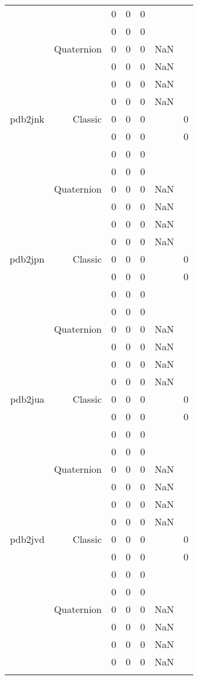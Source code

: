 \begin{xltabular}{\textwidth}{r|rcccSc}
& & 0 & 0 & 0 & & \\
& & 0 & 0 & 0 & & \\
& Quaternion & 0 & 0 & 0 & NaN & \\
& & 0 & 0 & 0 & NaN & \\
& & 0 & 0 & 0 & NaN & \\
& & 0 & 0 & 0 & NaN & \\ \addlinespace
pdb2jnk & Classic & 0 & 0 & 0 & & 0 \\
& & 0 & 0 & 0 & & 0 \\
& & 0 & 0 & 0 & & \\
& & 0 & 0 & 0 & & \\
& Quaternion & 0 & 0 & 0 & NaN & \\
& & 0 & 0 & 0 & NaN & \\
& & 0 & 0 & 0 & NaN & \\
& & 0 & 0 & 0 & NaN & \\ \addlinespace
pdb2jpn & Classic & 0 & 0 & 0 & & 0 \\
& & 0 & 0 & 0 & & 0 \\
& & 0 & 0 & 0 & & \\
& & 0 & 0 & 0 & & \\
& Quaternion & 0 & 0 & 0 & NaN & \\
& & 0 & 0 & 0 & NaN & \\
& & 0 & 0 & 0 & NaN & \\
& & 0 & 0 & 0 & NaN & \\ \addlinespace
pdb2jua & Classic & 0 & 0 & 0 & & 0 \\
& & 0 & 0 & 0 & & 0 \\
& & 0 & 0 & 0 & & \\
& & 0 & 0 & 0 & & \\
& Quaternion & 0 & 0 & 0 & NaN & \\
& & 0 & 0 & 0 & NaN & \\
& & 0 & 0 & 0 & NaN & \\
& & 0 & 0 & 0 & NaN & \\ \addlinespace
pdb2jvd & Classic & 0 & 0 & 0 & & 0 \\
& & 0 & 0 & 0 & & 0 \\
& & 0 & 0 & 0 & & \\
& & 0 & 0 & 0 & & \\
& Quaternion & 0 & 0 & 0 & NaN & \\
& & 0 & 0 & 0 & NaN & \\
& & 0 & 0 & 0 & NaN & \\
& & 0 & 0 & 0 & NaN & \\ \addlinespace

\end{xltabular}
